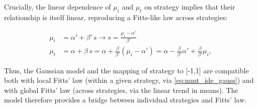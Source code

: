 \documentclass[acmlarge, manuscript,review]{acmart}
\newcommand{\mmt}{\ensuremath{\overline{\mt}}\xspace}
\newcommand{\mt}{\ensuremath{{\text{MT}}}\xspace}
\newcommand{\ide}{\ensuremath{{\text{ID}_e}}\xspace}
\begin{document}
Crucially, the linear dependence of $\mu_i$ and $\mu_t$ on strategy implies that their relationship is itself linear, reproducing a Fitts-like law across strategies:

\begin{align}
  \mu_i & = \alpha' + \beta'\,s  \longrightarrow s =  \frac{\mu_i - \alpha'}{\beta'} \\
  \mu_t & = \alpha + \beta\,s = \alpha + \frac{\beta}{\beta'} (\mu_i - \alpha')  = \alpha - \frac{\beta}{\beta'}\alpha' + \frac{\beta}{\beta'}\mu_i,
\end{align}

Thus, the Gaussian model and the mapping of strategy to [-1,1] are compatible both with local Fitts' law (within a given strategy, via \autoref{eq:mmt_ide_gauss}) and with global Fitts' law (across strategies, via the linear trend in means). The model therefore provides a bridge between individual strategies and Fitts' law.

\end{document}

